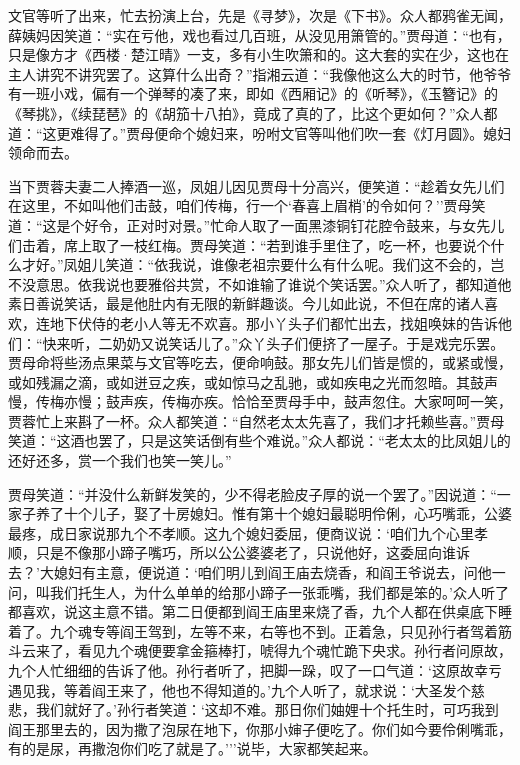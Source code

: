 文官等听了出来，忙去扮演上台，先是《寻梦》，次是《下书》。众人都鸦雀无闻，薛姨妈因笑道：``实在亏他，戏也看过几百班，从没见用箫管的。''贾母道：``也有，只是像方才《西楼·楚江晴》一支，多有小生吹箫和的。这大套的实在少，这也在主人讲究不讲究罢了。这算什么出奇？''指湘云道：``我像他这么大的时节，他爷爷有一班小戏，偏有一个弹琴的凑了来，即如《西厢记》的《听琴》，《玉簪记》的《琴挑》，《续琵琶》的《胡笳十八拍》，竟成了真的了，比这个更如何？''众人都道：``这更难得了。''贾母便命个媳妇来，吩咐文官等叫他们吹一套《灯月圆》。媳妇领命而去。

当下贾蓉夫妻二人捧酒一巡，凤姐儿因见贾母十分高兴，便笑道：``趁着女先儿们在这里，不如叫他们击鼓，咱们传梅，行一个`春喜上眉梢'的令如何？''贾母笑道：``这是个好令，正对时对景。''忙命人取了一面黑漆铜钉花腔令鼓来，与女先儿们击着，席上取了一枝红梅。贾母笑道：``若到谁手里住了，吃一杯，也要说个什么才好。''凤姐儿笑道：``依我说，谁像老祖宗要什么有什么呢。我们这不会的，岂不没意思。依我说也要雅俗共赏，不如谁输了谁说个笑话罢。''众人听了，都知道他素日善说笑话，最是他肚内有无限的新鲜趣谈。今儿如此说，不但在席的诸人喜欢，连地下伏侍的老小人等无不欢喜。那小丫头子们都忙出去，找姐唤妹的告诉他们：``快来听，二奶奶又说笑话儿了。''众丫头子们便挤了一屋子。于是戏完乐罢。贾母命将些汤点果菜与文官等吃去，便命响鼓。那女先儿们皆是惯的，或紧或慢，或如残漏之滴，或如迸豆之疾，或如惊马之乱驰，或如疾电之光而忽暗。其鼓声慢，传梅亦慢；鼓声疾，传梅亦疾。恰恰至贾母手中，鼓声忽住。大家呵呵一笑，贾蓉忙上来斟了一杯。众人都笑道：``自然老太太先喜了，我们才托赖些喜。''贾母笑道：``这酒也罢了，只是这笑话倒有些个难说。''众人都说：``老太太的比凤姐儿的还好还多，赏一个我们也笑一笑儿。''

贾母笑道：``并没什么新鲜发笑的，少不得老脸皮子厚的说一个罢了。''因说道：``一家子养了十个儿子，娶了十房媳妇。惟有第十个媳妇最聪明伶俐，心巧嘴乖，公婆最疼，成日家说那九个不孝顺。这九个媳妇委屈，便商议说：`咱们九个心里孝顺，只是不像那小蹄子嘴巧，所以公公婆婆老了，只说他好，这委屈向谁诉去？'大媳妇有主意，便说道：`咱们明儿到阎王庙去烧香，和阎王爷说去，问他一问，叫我们托生人，为什么单单的给那小蹄子一张乖嘴，我们都是笨的。'众人听了都喜欢，说这主意不错。第二日便都到阎王庙里来烧了香，九个人都在供桌底下睡着了。九个魂专等阎王驾到，左等不来，右等也不到。正着急，只见孙行者驾着筋斗云来了，看见九个魂便要拿金箍棒打，唬得九个魂忙跪下央求。孙行者问原故，九个人忙细细的告诉了他。孙行者听了，把脚一跺，叹了一口气道：`这原故幸亏遇见我，等着阎王来了，他也不得知道的。'九个人听了，就求说：`大圣发个慈悲，我们就好了。'孙行者笑道：`这却不难。那日你们妯娌十个托生时，可巧我到阎王那里去的，因为撒了泡尿在地下，你那小婶子便吃了。你们如今要伶俐嘴乖，有的是尿，再撒泡你们吃了就是了。'''说毕，大家都笑起来。


